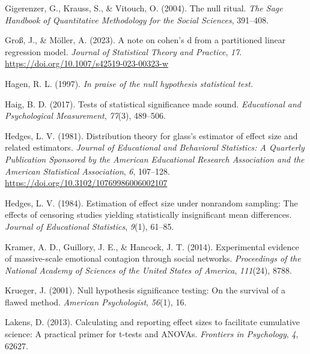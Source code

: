 \documentclass[
  man]{apa7}
\newlength{\cslhangindent}
\newlength{\cslentryspacingunit} %
\newenvironment{CSLReferences}[2] %
 {%
  \setlength{\parindent}{0pt}
  \ifodd #1
  \let\oldpar\par
  \def\par{\hangindent=\cslhangindent\oldpar}
  \fi
  \setlength{\parskip}{#2\cslentryspacingunit}
 }%
 {}
\begin{document}
\begin{CSLReferences}{1}{0}
\leavevmode{}%
Gigerenzer, G., Krauss, S., \& Vitouch, O. (2004). The null ritual. \emph{The Sage Handbook of Quantitative Methodology for the Social Sciences}, 391--408.

\leavevmode{}%
Groß, J., \& Möller, A. (2023). A note on cohen's d from a partitioned linear regression model. \emph{Journal of Statistical Theory and Practice}, \emph{17}. \url{https://doi.org/10.1007/s42519-023-00323-w}

\leavevmode{}%
Hagen, R. L. (1997). \emph{In praise of the null hypothesis statistical test.}

\leavevmode{}%
Haig, B. D. (2017). Tests of statistical significance made sound. \emph{Educational and Psychological Measurement}, \emph{77}(3), 489--506.

\leavevmode{}%
Hedges, L. V. (1981). Distribution theory for glass's estimator of effect size and related estimators. \emph{Journal of Educational and Behavioral Statistics: A Quarterly Publication Sponsored by the American Educational Research Association and the American Statistical Association}, \emph{6}, 107--128. \url{https://doi.org/10.3102/10769986006002107}

\leavevmode{}%
Hedges, L. V. (1984). Estimation of effect size under nonrandom sampling: The effects of censoring studies yielding statistically insignificant mean differences. \emph{Journal of Educational Statistics}, \emph{9}(1), 61--85.

\leavevmode{}%
Kramer, A. D., Guillory, J. E., \& Hancock, J. T. (2014). Experimental evidence of massive-scale emotional contagion through social networks. \emph{Proceedings of the National Academy of Sciences of the United States of America}, \emph{111}(24), 8788.

\leavevmode{}%
Krueger, J. (2001). Null hypothesis significance testing: On the survival of a flawed method. \emph{American Psychologist}, \emph{56}(1), 16.

\leavevmode{}%
Lakens, D. (2013). Calculating and reporting effect sizes to facilitate cumulative science: A practical primer for t-tests and ANOVAs. \emph{Frontiers in Psychology}, \emph{4}, 62627.


\end{CSLReferences}
\end{document}
